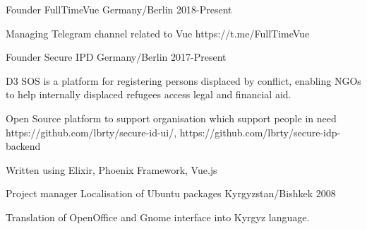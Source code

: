 \begin{cventries}
  \cventry
    {Founder}
    {FullTimeVue}
    {Germany/Berlin}
    {2018-Present}
    {
      \begin{cvitems}
        \item {Managing Telegram channel related to Vue https://t.me/FullTimeVue}
      \end{cvitems}
    }
  \cventry
    {Founder}
    {Secure IPD}
    {Germany/Berlin}
    {2017-Present}
    {
      \begin{cvitems}
        \item {D3 SOS is a platform for registering persons displaced by conflict, enabling NGOs to help internally displaced refugees access legal and financial aid.}
        \item {Open Source platform to support organisation which support people in need https://github.com/lbrty/secure-id-ui/, https://github.com/lbrty/secure-idp-backend}
        \item {Written using Elixir, Phoenix Framework, Vue.js}
      \end{cvitems}
    }
  \cventry
    {Project manager}
    {Localisation of Ubuntu packages}
    {Kyrgyzstan/Bishkek}
    {2008}
    {
      \begin{cvitems}
        \item {Translation of OpenOffice and Gnome interface into Kyrgyz language.}
      \end{cvitems}
    }
\end{cventries}
